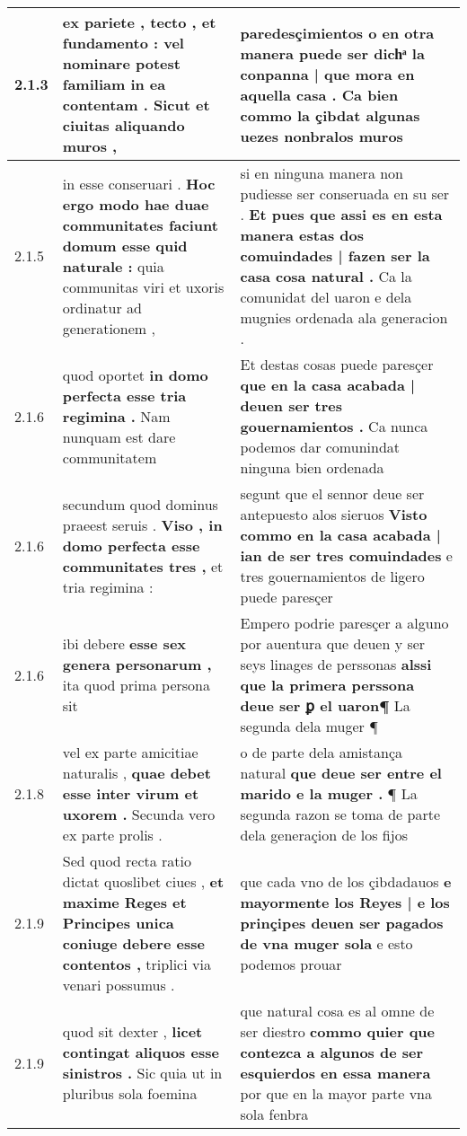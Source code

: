 \begin{tabular}{|p{1cm}|p{6.5cm}|p{6.5cm}|}
2.1.3 & ex pariete , tecto , et fundamento : \textbf{ vel nominare potest familiam in ea contentam . } Sicut et ciuitas aliquando muros , & paredesçimientos \textbf{ o en otra manera puede ser dichͣ la conpanna | que mora en aquella casa . } Ca bien commo la çibdat algunas uezes nonbralos muros \\\hline
2.1.5 & in esse conseruari . \textbf{ Hoc ergo modo hae duae communitates faciunt domum esse quid naturale : } quia communitas viri et uxoris ordinatur ad generationem , & si en ninguna manera non pudiesse ser conseruada en su ser . \textbf{ Et pues que assi es en esta manera estas dos comuindades | fazen ser la casa cosa natural . } Ca la comunidat del uaron e dela mugnies ordenada ala generacion . \\\hline
2.1.6 & quod oportet \textbf{ in domo perfecta esse tria regimina . } Nam nunquam est dare communitatem & Et destas cosas puede paresçer \textbf{ que en la casa acabada | deuen ser tres gouernamientos . } Ca nunca podemos dar comunindat ninguna bien ordenada \\\hline
2.1.6 & secundum quod dominus praeest seruis . \textbf{ Viso , in domo perfecta esse communitates tres , } et tria regimina : & segunt que el sennor deue ser antepuesto alos sieruos \textbf{ Visto commo en la casa acabada | ian de ser tres comuindades } e tres gouernamientos de ligero puede paresçer \\\hline
2.1.6 & ibi debere \textbf{ esse sex genera personarum , } ita quod prima persona sit & Empero podrie paresçer a alguno por auentura que deuen y ser seys linages de perssonas \textbf{ alssi que la primera perssona deue ser ꝑ el uaron¶ } La segunda dela muger ¶ \\\hline
2.1.8 & vel ex parte amicitiae naturalis , \textbf{ quae debet esse inter virum et uxorem . } Secunda vero ex parte prolis . & o de parte dela amistança natural \textbf{ que deue ser entre el marido e la muger . } ¶ La segunda razon se toma de parte dela generaçion de los fijos \\\hline
2.1.9 & Sed quod recta ratio dictat quoslibet ciues , \textbf{ et maxime Reges et Principes unica coniuge debere esse contentos , } triplici via venari possumus . & que cada vno de los çibdadauos \textbf{ e mayormente los Reyes | e los prinçipes deuen ser pagados de vna muger sola } e esto podemos prouar \\\hline
2.1.9 & quod sit dexter , \textbf{ licet contingat aliquos esse sinistros . } Sic quia ut in pluribus sola foemina & que natural cosa es al omne de ser diestro \textbf{ commo quier que contezca a algunos de ser esquierdos en essa manera } por que en la mayor parte vna sola fenbra \\\hline

\end{tabular}
